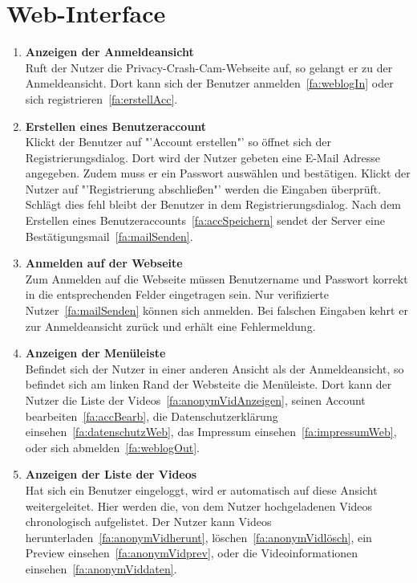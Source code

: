 \section{\gls{Web-Interface}}
\begin{enumerate}
\renewcommand{\labelenumi}{\textbf{\theenumi}}
\renewcommand{\theenumi}{FA\arabic{enumi}0}
\setcounter{enumi}{299}
\item \label{fa:loginWeb} \textbf{Anzeigen der Anmeldeansicht} \hfill \\
Ruft der Nutzer die Privacy-Crash-Cam-Webseite auf, so gelangt er zu der Anmeldeansicht. Dort kann sich der Benutzer anmelden~\eqref{fa:weblogIn} oder sich registrieren~\eqref{fa:erstellAcc}.

\item \label{fa:erstellAcc}\textbf{Erstellen eines Benutzeraccount} \hfill \\
Klickt der Benutzer auf "'Account erstellen"' so öffnet sich der Registrierungsdialog. Dort wird der Nutzer gebeten eine \gls{E-Mail} Adresse angegeben. Zudem muss er ein Passwort auswählen und bestätigen. Klickt der Nutzer auf "'Registrierung abschließen"' werden die Eingaben überprüft. Schlägt dies fehl bleibt der Benutzer in dem Registrierungsdialog. Nach dem Erstellen eines Benutzeraccounts~\eqref{fa:accSpeichern} sendet der Server eine Bestätigungsmail~\eqref{fa:mailSenden}.

\item \label{fa:weblogIn}\textbf{Anmelden auf der Webseite} \hfill \\
Zum Anmelden auf die Webseite müssen Benutzername und Passwort korrekt in die entsprechenden Felder eingetragen sein. Nur verifizierte Nutzer~\eqref{fa:mailSenden} können sich anmelden. Bei falschen Eingaben kehrt er zur Anmeldeansicht zurück und erhält eine Fehlermeldung.

\item \textbf{Anzeigen der Menüleiste} \hfill \\
Befindet sich der Nutzer in einer anderen Ansicht als der Anmeldeansicht, so befindet sich am linken Rand der Websteite die Menüleiste. Dort kann der Nutzer die Liste der  Videos~\eqref{fa:anonymVidAnzeigen}, seinen Account bearbeiten~\eqref{fa:accBearb}, die Datenschutzerklärung einsehen~\eqref{fa:datenschutzWeb}, das Impressum einsehen~\eqref{fa:impressumWeb}, oder sich abmelden~\eqref{fa:weblogOut}.

\item \label{fa:anonymVidAnzeigen}\textbf{Anzeigen der Liste der  Videos} \hfill \\
Hat sich ein Benutzer eingeloggt, wird er automatisch auf diese Ansicht weitergeleitet. Hier werden die, von dem Nutzer hochgeladenen Videos chronologisch aufgelistet. Der Nutzer kann Videos herunterladen~\eqref{fa:anonymVidherunt}, löschen~\eqref{fa:anonymVidlösch}, ein Preview einsehen~\eqref{fa:anonymVidprev}, oder die Videoinformationen einsehen~\eqref{fa:anonymViddaten}.


\end{enumerate}
